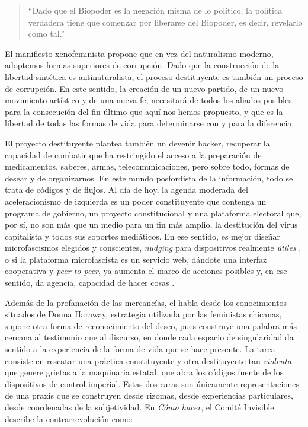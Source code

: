 \begin{quote}
  \enquote{Dado que el Biopoder es la negación misma de lo político, la política verdadera tiene que comenzar por liberarse del Biopoder, es decir, revelarlo como tal.} \autocite{tiqqunTesisSobrePartido}
\end{quote}

El manifiesto xenofeminista propone que en vez del naturalismo moderno, adoptemos formas superiores de corrupción. Dado que la construcción de la libertad sintética es antinaturalista, el proceso destituyente es también un proceso de corrupción. En este sentido, la creación de un nuevo partido, de un nuevo movimiento artístico y de una nueva fe, necesitará de todos los aliados posibles para la consecución del fin último que aquí nos hemos propuesto, y que es la libertad de todas las formas de vida para determinarse con y para la diferencia.

El proyecto destituyente plantea también un devenir hacker, recuperar la capacidad de combatir que ha restringido el acceso a la preparación de medicamentos, saberes, armas, telecomunicaciones, pero sobre todo, formas de desear y de organizarnos. En este mundo posfordista de la información, todo se trata de códigos y de flujos. Al día de hoy, la agenda moderada del aceleracionismo de izquierda es un poder constituyente que contenga un programa de gobierno, un proyecto constitucional y una plataforma electoral que, por sí, no son más que un medio para un fin más amplio, la destitución del virus capitalista y todos sus soportes mediáticos. En ese sentido, es mejor diseñar microfascismos elegidos y conscientes, \emph{nudging} para dispositivos realmente \emph{útiles} \autocite{CededInterfileFutureOriented2019}, o si la plataforma microfascista es un servicio web, dándote una interfaz cooperativa y \emph{peer to peer}, ya aumenta el marco de acciones posibles y, en ese sentido, da agencia, capacidad de hacer cosas \autocite{briaultCorpsDeconstructionFascismes}.

Además de la profanación de las mercancías, el habla desde los conocimientos situados de Donna Haraway, estrategia utilizada por las feministas chicanas, supone otra forma de reconocimiento del deseo, pues construye una palabra más cercana al testimonio que al discurso, en donde cada espacio de singularidad da sentido a la experiencia de la forma de vida que se hace presente. La tarea consiste en rescatar una práctica constituyente y otra destituyente tan \emph{violenta} que genere grietas a la maquinaria estatal, que abra los códigos fuente de los dispositivos de control imperial. Estas dos caras son únicamente representaciones de una praxis que se construyen desde rizomas, desde experiencias particulares, desde coordenadas de la subjetividad. En \emph{Cómo hacer}, el Comité Invisible describe la contrarrevolución
como:

